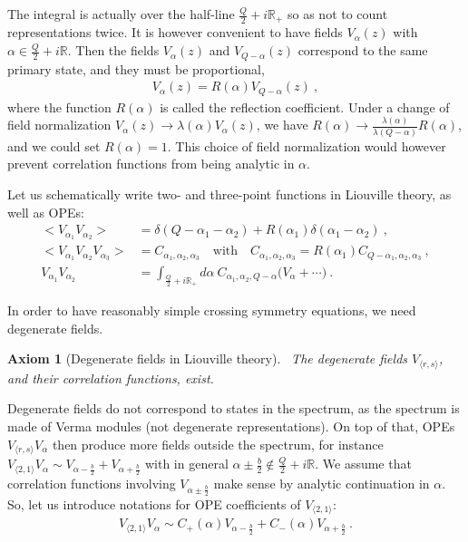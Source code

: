 \documentclass[12pt, a4paper]{article}
\theoremstyle{break}
\newtheorem{hyp}[exo]{Axiom}
\begin{document}
The integral is actually over the half-line $\frac{Q}{2}+i\mathbb{R}_+$ so as not to count representations twice. 
It is however convenient to have fields $V_\alpha(z)$ with $\alpha \in \frac{Q}{2}+i\mathbb{R}$. 
Then the fields $V_\alpha(z)$ and $V_{Q-\alpha}(z)$ correspond to the same primary state, and they must be proportional, 
\begin{align}
 V_\alpha(z) = R(\alpha) V_{Q-\alpha}(z)\ ,
\end{align}
where the function $R(\alpha)$ is called the reflection coefficient.
Under a change of field normalization $V_\alpha(z) \to \lambda(\alpha)V_\alpha(z)$, we have $R(\alpha) \to \frac{\lambda(\alpha)}{\lambda(Q-\alpha)} R(\alpha)$, and we could set $R(\alpha)=1$. 
This choice of field normalization would however prevent correlation functions from being analytic in $\alpha$.

Let us schematically write two- and three-point functions in Liouville theory, as well as OPEs:
\begin{align}
 \Big< V_{\alpha_1}V_{\alpha_2} \Big>  &=  \delta(Q-\alpha_1-\alpha_2) + R(\alpha_1)\delta(\alpha_1-\alpha_2)\ ,
 \label{eq:vv}
 \\
 \Big< V_{\alpha_1}V_{\alpha_2}V_{\alpha_3} \Big> & = C_{\alpha_1,\alpha_2,\alpha_3} \quad \text{with} \quad C_{\alpha_1,\alpha_2,\alpha_3} = R(\alpha_1) C_{Q-\alpha_1,\alpha_2,\alpha_3}\ ,
 \\
 V_{\alpha_1}V_{\alpha_2} &= \int_{\frac{Q}{2}+i\mathbb{R}_+} d\alpha\ C_{\alpha_1,\alpha_2,Q-\alpha} \Big( V_\alpha + \cdots\Big)\ .
 \label{eq:v1v2}
\end{align}

In order to have reasonably simple crossing symmetry equations, we need degenerate fields. 
\begin{hyp}[Degenerate fields in Liouville theory]
 ~\label{hyp:degl}
 The degenerate fields $V_{\langle r, s\rangle}$, and their correlation functions, exist. 
\end{hyp}
Degenerate fields do not correspond to states in the spectrum, as the spectrum is made of Verma modules (not degenerate representations). 
On top of that, 
OPEs $V_{\langle r, s\rangle}V_\alpha$ then produce more fields outside the spectrum, for instance 
$V_{\langle 2, 1\rangle} V_\alpha \sim V_{\alpha-\frac{b}{2}} + V_{\alpha+\frac{b}{2}}$ with in general $\alpha\pm\frac{b}{2}\notin \frac{Q}{2}+i\mathbb{R}$. We assume that correlation functions involving $V_{\alpha\pm\frac{b}{2}}$ make sense by analytic continuation in $\alpha$. So, let us introduce notations for OPE coefficients of $V_{\langle 2, 1\rangle}$:
\begin{align}
 V_{\langle 2, 1\rangle} V_\alpha \sim C_+(\alpha) V_{\alpha-\frac{b}{2}} + C_-(\alpha)V_{\alpha +\frac{b}{2}}\ .
\end{align}
\end{document}

